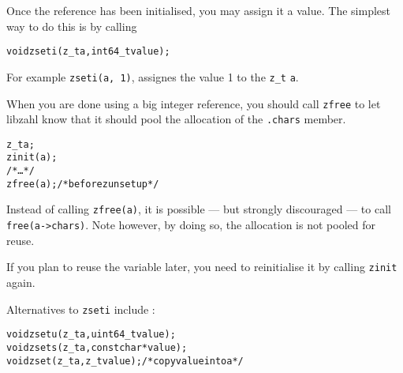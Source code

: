 Once the reference has been initialised, you may assign it
a value. The simplest way to do this is by calling

\begin{alltt}
   void zseti(z_t a, int64_t value);
\end{alltt}

\noindent
For example {\tt zseti(a, 1)}, assignes the value 1 to
the {\tt z\_t} {\tt a}.

When you are done using a big integer reference, you should
call {\tt zfree} to let libzahl know that it should pool
the allocation of the {\tt .chars} member.

\begin{alltt}
   z_t a;
   zinit(a);
   \textcolor{c}{/* \textrm{\ldots} */}
   zfree(a); \textcolor{c}{/* \textrm{before \texttt{zunsetup}} */}
\end{alltt}

\noindent
Instead of calling {\tt zfree(a)}, it is possible — but
strongly discouraged — to call {\tt free(a->chars)}.
Note however, by doing so, the allocation is not pooled
for reuse.

If you plan to reuse the variable later, you need to
reinitialise it by calling {\tt zinit} again.

Alternatives to {\tt zseti} include :

\begin{alltt}
   void zsetu(z_t a, uint64_t value);
   void zsets(z_t a, const char *value);
   void zset(z_t a, z_t value); \textcolor{c}{/* \textrm{copy \texttt{value} into \texttt{a}} */}
\end{alltt}
